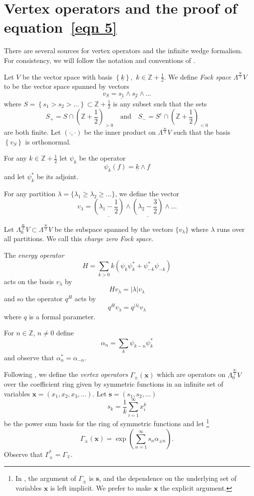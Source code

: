 \documentclass[12pt]{amsart}
\newcommand{\znums} {{\mathbb Z}}		%
\newcommand{\half}{\frac{1}{2}}
\theoremstyle{definition}
\newcommand{\FockSpace}{\Lambda^{\frac{\infty}{2}}V}
\newcommand{\FockSpaceZero}{\Lambda^{\frac{\infty}{2}}_{0}V}
\newcommand{\ZplusHalf}{\znums+{ \half}}
\begin{document}
\section{Vertex operators and the proof of equation~\eqref{eqn
5}}\label{sec: vertex ops and the pf of eqn 5}


There are several sources for vertex operators and the infinite wedge
formalism. For consistency, we will follow the notation and conventions
of \cite[Appendix~A]{Okounkov-InfWedge}.

Let $V$ be the vector space with basis $\left\{\underline{k}
\right\},$ $k\in \ZplusHalf$. We define \emph{Fock space} $\FockSpace
$ to be the vector space spanned by vectors
\[
v_{S} = \underline{s_{1}}\wedge \underline{s_{2}}\wedge \dots 
\]
where $S=\left\{s_{1}>s_{2}>\dots \right\}\subset \ZplusHalf$ is
any subset such that the sets
\[
S_{+} = S\cap \left(\ZplusHalf \right)_{>0}\quad \text{and} \quad S_{-} =
S^{c}\cap \left(\ZplusHalf \right)_{<0}
\]
are both finite. Let $(\cdot ,\cdot )$ be the inner product on
$\FockSpace$ such that the basis $\left\{v_{S} \right\}$ is
orthonormal. 

For any $k\in \ZplusHalf $ let $\psi_{k}$ be the operator
\[
\psi_{k}(f) = \underline{k}\wedge f
\]
and let $\psi^{*}_{k}$ be its adjoint.

For any partition $\lambda =\{\lambda_{1}\geq \lambda_{2}\geq \dots
\}$, we define the vector
\[
v_{\lambda}  = \underline{(\lambda_{1}-\half )}\wedge
\underline{(\lambda_{2}-\frac{3}{2})}\wedge \dots  
\]

Let $\FockSpaceZero \subset \FockSpace$ be the subspace spanned by the
vectors $\{v_{\lambda} \}$ where $\lambda$ runs over all
partitions. We call this \emph{charge zero Fock space.}

The \emph{energy operator}
\[
H=\sum_{k>0} k\left(\psi_{k}\psi_{k}^{*}+\psi_{-k}^{*}\psi_{-k} \right)
\]
acts on the basis $v_{\lambda}$ by
\[
Hv_{\lambda}  = |\lambda |v_{\lambda }
\]
and so the operator $q^{H}$ acts by
\[
q^{H}v_{\lambda} = q^{|\lambda |}v_{\lambda }
\]
where $q$ is a formal parameter.

For $n\in \znums$, $n\neq 0$ define
\[
\alpha_{n}=\sum_{k} \psi_{k-n}\psi^{*}_{k}
\]
and observe that $\alpha^{*}_{n}=\alpha_{-n}$.

Following \cite{Okounkov-InfWedge}, we define the \emph{vertex
operators} $\Gamma_{\pm}(\mathbf{x})$ which are operators on
$\FockSpaceZero$ over the coefficient ring given by symmetric
functions in an infinite set of variables $\mathbf{x} =
(x_{1},x_{2},x_{3},\dots )$. Let $\mathbf{s}=(s_{1},s_{2},\dots )$
\[
s_{k} =\frac{1}{k}\sum_{i=1}^{\infty} x_{i}^{k}
\]
be the power sum basis for the ring of symmetric functions and
let
\footnote{In \cite{Okounkov-InfWedge}, the argument of
$\Gamma_{\pm}$ is $\mathbf{s}$, and the dependence on the underlying set of
variables $\mathbf{x}$ is left implicit. We prefer to make
$\mathbf{x}$ the explicit argument.}
\[
\Gamma_{\pm}(\mathbf{x}) =
\exp\left(\sum_{n=1}^{\infty}s_{n}\alpha_{\pm n } \right).
\]
Observe that $\Gamma^{*}_{\pm}=\Gamma_{\mp}$.
\end{document}
